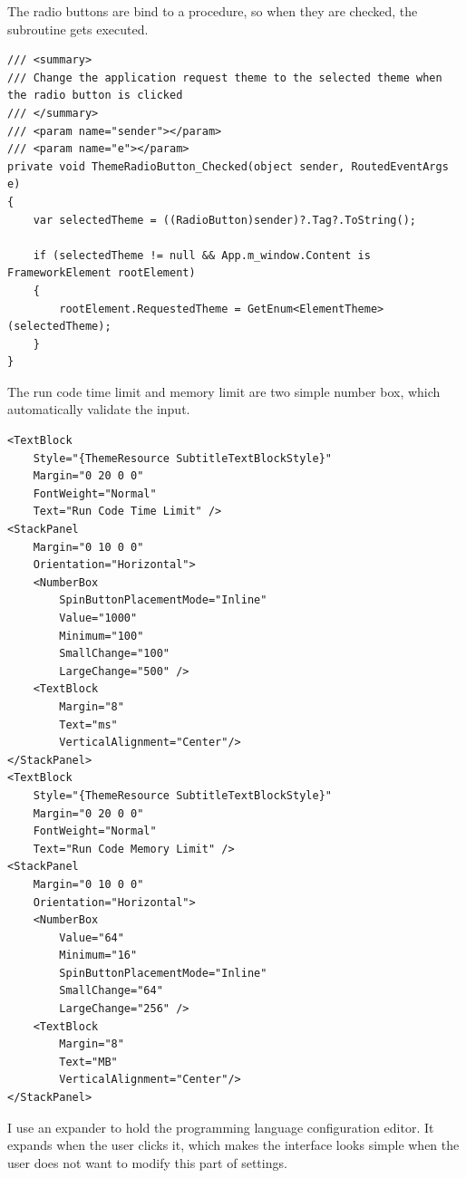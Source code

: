 \documentclass[a4paper]{report}
\begin{document}
The radio buttons are bind to a procedure, so when they are checked, the subroutine gets executed.

\begin{verbatim}
/// <summary>
/// Change the application request theme to the selected theme when the radio button is clicked
/// </summary>
/// <param name="sender"></param>
/// <param name="e"></param>
private void ThemeRadioButton_Checked(object sender, RoutedEventArgs e)
{
    var selectedTheme = ((RadioButton)sender)?.Tag?.ToString();

    if (selectedTheme != null && App.m_window.Content is FrameworkElement rootElement)
    {
        rootElement.RequestedTheme = GetEnum<ElementTheme>(selectedTheme);
    }
}
\end{verbatim}

The run code time limit and memory limit are two simple number box, which automatically validate the input.

\begin{verbatim}
<TextBlock
    Style="{ThemeResource SubtitleTextBlockStyle}"
    Margin="0 20 0 0"
    FontWeight="Normal"
    Text="Run Code Time Limit" />
<StackPanel 
    Margin="0 10 0 0"
    Orientation="Horizontal">
    <NumberBox
        SpinButtonPlacementMode="Inline"
        Value="1000"
        Minimum="100"
        SmallChange="100"
        LargeChange="500" />
    <TextBlock 
        Margin="8"
        Text="ms"
        VerticalAlignment="Center"/>
</StackPanel>
<TextBlock
    Style="{ThemeResource SubtitleTextBlockStyle}"
    Margin="0 20 0 0"
    FontWeight="Normal"
    Text="Run Code Memory Limit" />
<StackPanel 
    Margin="0 10 0 0"
    Orientation="Horizontal">
    <NumberBox
        Value="64"
        Minimum="16"
        SpinButtonPlacementMode="Inline"
        SmallChange="64"
        LargeChange="256" />
    <TextBlock
        Margin="8"
        Text="MB"
        VerticalAlignment="Center"/>
</StackPanel>
\end{verbatim}

I use an expander to hold the programming language configuration editor. It expands when the user clicks it, which makes the interface looks simple when the user does not want to modify this part of settings.
\end{document}
